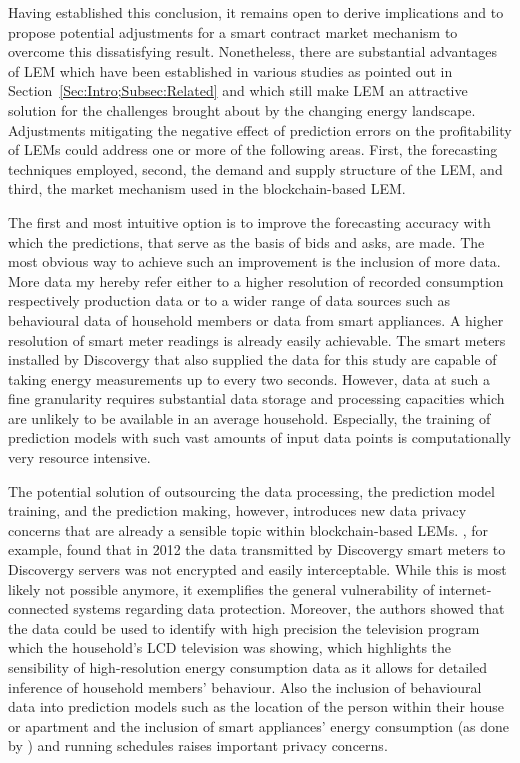 Having established this conclusion, it remains open to derive implications and to propose potential adjustments for a smart contract market mechanism to overcome this dissatisfying result. Nonetheless, there are substantial advantages of LEM which have been established in various studies as pointed out in Section~\ref{Sec:Intro;Subsec:Related} and which still make LEM an attractive solution for the challenges brought about by the changing energy landscape. Adjustments mitigating the negative effect of prediction errors on the profitability of LEMs could address one or more of the following areas. First, the forecasting techniques employed, second, the demand and supply structure of the LEM, and third, the market mechanism used in the blockchain-based LEM.

The first and most intuitive option is to improve the forecasting accuracy with which the predictions, that serve as the basis of bids and asks, are made. The most obvious way to achieve such an improvement is the inclusion of more data. More data my hereby refer either to a higher resolution of recorded consumption respectively production data or to a wider range of data sources such as behavioural data of household members or data from smart appliances. A higher resolution of smart meter readings is already easily achievable. The smart meters installed by Discovergy that also supplied the data for this study are capable of taking energy measurements up to every two seconds. However, data at such a fine granularity requires substantial data storage and processing capacities which are unlikely to be available in an average household. Especially, the training of prediction models with such vast amounts of input data points is computationally very resource intensive.

The potential solution of outsourcing the data processing, the prediction model training, and the prediction making, however, introduces new data privacy concerns that are already a sensible topic within blockchain-based LEMs. \citet{Greveler:2012}, for example, found that in 2012 the data transmitted by Discovergy smart meters to Discovergy servers was not encrypted and easily interceptable. While this is most likely not possible anymore, it exemplifies the general vulnerability of internet-connected systems regarding data protection. Moreover, the authors showed that the data could be used to identify with high precision the television program which the household's LCD television was showing, which highlights the sensibility of high-resolution energy consumption data as it allows for detailed inference of household members' behaviour. Also the inclusion of behavioural data into prediction models such as the location of the person within their house or apartment and the inclusion of smart appliances' energy consumption (as done by \citet{Kong:2018}) and running schedules raises important privacy concerns.

